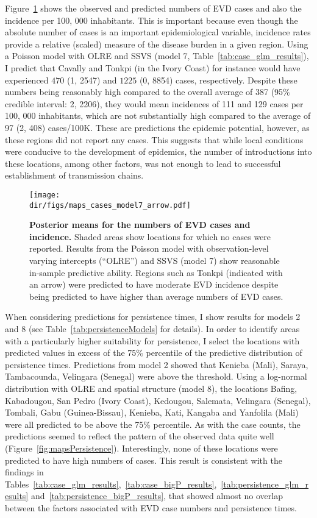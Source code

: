 Figure~\ref{fig:mapsCases} shows the observed and predicted numbers of EVD cases and also the incidence per 100, 000 inhabitants.
This is important because even though the absolute number of cases is an important epidemiological variable, incidence rates provide a relative (scaled) measure of the disease burden in a given region.
Using a Poisson model with OLRE and SSVS (model 7, Table~\ref{tab:case_glm_results}), I predict that Cavally and Tonkpi (in the Ivory Coast) for instance would have experienced $470$ (1, 2547) and $1225$ (0, 8854) cases, respectively.
Despite these numbers being reasonably high compared to the overall average of 387 (95\% credible interval: 2, 2206), they would mean incidences of 111 and 129 cases per 100, 000 inhabitants, which are not substantially high compared to the average of 97 (2, 408) cases/100K.
These are predictions the epidemic potential, however, as these regions did not report any cases.
This suggests that while local conditions were conducive to the development of epidemics, the number of introductions into these locations, among other factors, was not enough to lead to successful establishment of transmission chains. 

\begin{figure}[htbp]
  \centering
  \texttt{[image: \\dir/figs/maps\_cases\_model7\_arrow.pdf]}
  \caption[Case counts predictions]{\textbf{Posterior means for the numbers of EVD cases and incidence.}
  Shaded areas show locations for which no cases were reported.
  Results from the Poisson model with observation-level varying intercepts (``OLRE'') and SSVS (model 7) show reasonable in-sample predictive ability.
  Regions such as Tonkpi (indicated with an arrow) were predicted to have moderate EVD incidence despite being predicted to have higher than average numbers of EVD cases.
  }
  \label{fig:mapsCases}
\end{figure}

When considering predictions for persistence times, I show results for models 2 and 8 (see Table~\ref{tab:persistenceModels} for details).
In order to identify areas with a particularly higher suitability for persistence, I select the locations with predicted values in excess of the 75\% percentile of the predictive distribution of persistence times.
Predictions from model 2 showed that Kenieba (Mali), Saraya, Tambacounda, Velingara (Senegal) were above the threshold.
Using a log-normal distribution with OLRE and spatial structure (model 8), the locations Bafing, Kabadougou, San Pedro (Ivory Coast), Kedougou, Salemata, Velingara (Senegal), Tombali, Gabu (Guinea-Bissau), Kenieba, Kati, Kangaba and Yanfolila (Mali) were all predicted to be above the 75\% percentile.
As with the case counts, the predictions seemed to reflect the pattern of the observed data quite well (Figure~\ref{fig:mapsPersistence}).
Interestingly, none of these locations were predicted to have high numbers of cases.
This result is consistent with the findings in Tables~\ref{tab:case_glm_results},~\ref{tab:case_bigP_results},~\ref{tab:persistence_glm_results} and~\ref{tab:persistence_bigP_results}, that showed almost no overlap between the factors associated with EVD case numbers and persistence times.

